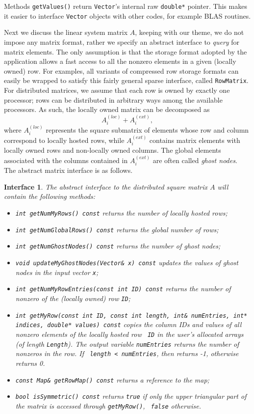 \documentclass[acmtoms,acmnow]{acmtrans2m}
\newtheorem{interface}{Interface}[section]
\begin{document}
Methods {\tt getValues()} return {\tt Vector}'s internal raw
{\tt double*} pointer. This makes it easier to interface {\tt Vector} objects
with other codes, for example BLAS routines.

Next we discuss the linear system matrix $A$, keeping with our
theme, we do not impose any matrix format, rather we specify an
abstract interface to {\sl query} for matrix elements. The only
assumption is that the storage format adopted by the application
allows a fast access to all the nonzero elements in a given (locally
owned) row. For examples, all variants of compressed row storage
formats can easily be wrapped to satisfy this fairly general sparse
interface, called {\tt RowMatrix}. For distributed matrices, we
assume that each row is owned by exactly one processor; rows can be
distributed in arbitrary ways among the available processors. As
such, the locally owned matrix can be decomposed as
\begin{equation}
A^{(loc)}_i + A^{(ext)}_i,
\end{equation}
where $A^{(loc)}_i$ represents the square submatrix of elements
whose row and column correspond to locally hosted rows, while
$A^{(ext)}_i$ contains matrix elements with locally owned rows and
non-locally owned columns. The global elements associated with the
columns contained in $A_i^{(ext)}$ are often called {\sl ghost
nodes}. The abstract matrix interface is as follows.
\begin{interface}
\label{int:ami}
The abstract interface to the distributed square matrix $A$
will contain the following methods:
\begin{itemize}
\item \verb!int getNumMyRows() const! returns the number of locally hosted rows;
\item \verb!int getNumGlobalRows() const! returns the global number of rows;
\item \verb!int getNumGhostNodes() const! returns the number of ghost nodes;
\item \verb!void updateMyGhostNodes(Vector& x) const! updates the values of ghost nodes
 in the input vector {\tt x};
\item {\tt int getNumMyRowEntries(const int ID) const} returns the number of nonzero of
the (locally owned) row {\tt ID};
\item {\tt int getMyRow(const int ID, const int length, int\& numEntries, int* indices, double*
                             values) const} copies the
column IDs and values of all nonzero elements of the locally hosted row {\tt
  ID} in the user's allocated arrays (of length {\tt Length}). The output
  variable {\tt numEntries} returns the number of nonzeros in the row. If {\tt
    length < numEntries}, then returns -1, otherwise returns 0.
\item \verb!const Map& getRowMap() const! returns a reference to the map;
\item \verb!bool isSymmetric() const! returns {\tt true} if only the upper
triangular part of the matrix is accessed through {\tt getMyRow()},
{\tt
  false} otherwise.
\end{itemize}
\end{interface}
\end{document}
